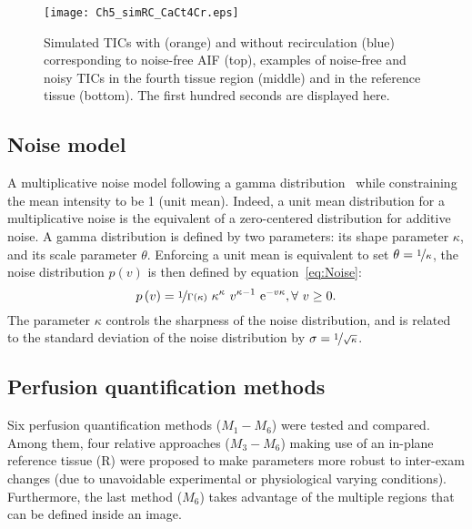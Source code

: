 \begin{figure}
\texttt{[image: Ch5\_simRC\_CaCt4Cr.eps]}
\vspace{-5mm}
\caption{Simulated TICs with (orange) and without recirculation (blue) corresponding to noise-free AIF (top), examples of noise-free and noisy TICs in the fourth tissue region (middle) and in the reference tissue (bottom). The first hundred seconds are displayed here.}
\label{fig:recmod}
\vspace{-3mm}
\end{figure}

\subsection{Noise model}
A multiplicative noise model following a gamma distribution~\cite{Barrois2013} while constraining the mean intensity to be 1 (unit mean). Indeed, a unit mean distribution for a multiplicative noise is the equivalent of a zero-centered distribution for additive noise. A gamma distribution is defined by two parameters: its shape parameter $\kappa$, and its scale parameter $\theta$. Enforcing a unit mean is equivalent to set $\theta = \nicefrac{1}{\kappa}$, the noise distribution $p\left(v\right)$ is then defined by equation~\ref{eq:Noise}:
\begin{equation}
p\left(v\right) = \nicefrac{1}{\Gamma\left(\kappa\right)} ~ \kappa^\kappa ~ v^{\kappa-1} ~ \mathrm e^{-v\kappa}, \forall~v \geq 0.
\label{eq:Noise}
\end{equation}
The parameter $\kappa$ controls the sharpness of the noise distribution, and is related to the standard deviation of the noise distribution by $\sigma = \nicefrac{1}{\sqrt{\kappa}}$.

\subsection{Perfusion quantification methods}
\label{sec:Models}
Six perfusion quantification methods ($M_1-M_6$) were tested and compared. Among them, four relative approaches ($M_3-M_6$) making use of an in-plane reference tissue (R) were proposed to make parameters more robust to inter-exam changes (due to unavoidable experimental or physiological varying conditions). Furthermore, the last method ($M_6$) takes advantage of the multiple regions that can be defined inside an image.

